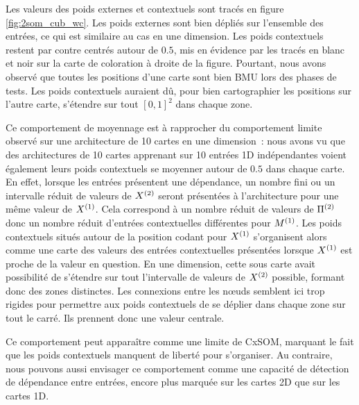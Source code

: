 \documentclass[../main]{subfiles}
\begin{document}
Les valeurs des poids externes et contextuels sont tracés en figure \ref{fig:2som_cub_wc}.
Les poids externes sont bien dépliés sur l'ensemble des entrées, ce qui est similaire au cas en une dimension.
Les poids contextuels restent par contre centrés autour de $0.5$, mis en évidence par les tracés en blanc et noir sur la carte de coloration à droite de la figure.
Pourtant, nous avons observé que toutes les positions d'une carte sont bien BMU lors des phases de tests. 
Les poids contextuels auraient dû, pour bien cartographier les positions sur l'autre carte, s'étendre sur tout $[0,1]^2$ dans chaque zone.


Ce comportement de moyennage est à rapprocher du comportement limite observé sur une architecture de 10 cartes en une dimension~: nous avons vu que des architectures de 10 cartes apprenant sur 10 entrées 1D indépendantes voient également leurs poids contextuels se moyenner autour de $0.5$ dans chaque carte.
En effet, lorsque les entrées présentent une  dépendance, un nombre fini ou un intervalle réduit de valeurs de $X^{({2})}$ seront présentées à l'architecture pour une même valeur de $X^{({1})}$. Cela correspond à un nombre réduit de valeurs de $\Pi^{({2})}$ donc un nombre réduit d'entrées contextuelles différentes pour $M^{({1})}$. 
Les poids contextuels situés autour de la position codant pour $X^{({1})}$ s'organisent alors comme une carte des valeurs des entrées contextuelles présentées lorsque $X^{({1})}$ est proche de la valeur en question. En une dimension, cette sous carte avait possibilité de s'étendre sur tout l'intervalle de valeurs de $X^{({2})}$ possible, formant donc des zones distinctes.
Les connexions entre les n\oe{}uds semblent ici trop rigides pour permettre aux poids contextuels de se déplier dans chaque zone sur tout le carré. Ils prennent donc une valeur centrale.


Ce comportement peut apparaître comme une limite de CxSOM, marquant le fait que les poids contextuels manquent de liberté pour s'organiser. Au contraire, nous pouvons aussi envisager ce comportement comme une capacité de détection de dépendance entre entrées, encore plus marquée sur les cartes 2D que sur les cartes 1D. 
\end{document}
